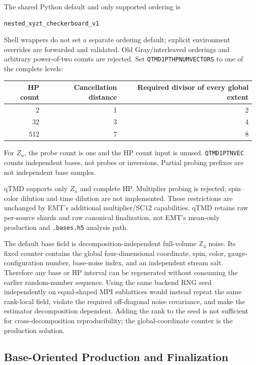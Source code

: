 \documentclass[11pt,a4paper]{article}
\newcommand{\code}[1]{\texttt{\begingroup\def\_{\textunderscore\allowbreak}#1\endgroup}}
\begin{document}
The shared Python default and only supported ordering is
\begin{verbatim}
nested_xyzt_checkerboard_v1
\end{verbatim}
Shell wrappers do not set a separate ordering default; explicit environment
overrides are forwarded and validated. Old Gray/interleaved orderings and
arbitrary power-of-two counts are rejected. Set
\code{QTMD\_1PT\_HP\_NUM\_VECTORS} to one of the complete levels:
\begin{center}
\begin{tabular}{rrr}
\toprule
HP count & Cancellation distance & Required divisor of every global extent \\
\midrule
2 & 1 & 2 \\
32 & 3 & 4 \\
512 & 7 & 8 \\
\bottomrule
\end{tabular}
\end{center}
For \(Z_n\), the probe count is one and the HP count input is unused.
\code{QTMD\_1PT\_N\_VEC} counts independent bases, not probes or inversions.
Partial probing prefixes are not independent base samples.

qTMD supports only \(Z_n\) and complete HP. Multiplier probing is rejected;
spin--color dilution and time dilution are not implemented. These restrictions
are unchanged by EMT's additional multiplier/SC12 capabilities. qTMD retains
raw per-source shards and raw canonical finalization, not EMT's mean-only
production and \code{.bases.h5} analysis path.

The default base field is decomposition-independent full-volume
\(\mathbb Z_4\) noise.  Its fixed counter contains the global four-dimensional
coordinate, spin, color, gauge-configuration number, base-noise index, and an
independent stream salt.  Therefore any base or HP interval can be regenerated
without consuming the earlier random-number sequence.
Using the same backend RNG seed independently on equal-shaped MPI sublattices
would instead repeat the same rank-local field, violate the required
off-diagonal noise covariance, and make the estimator decomposition dependent.
Adding the rank to the seed is not sufficient for cross-decomposition
reproducibility; the global-coordinate counter is the production solution.

\subsection{Base-Oriented Production and Finalization}
\end{document}
